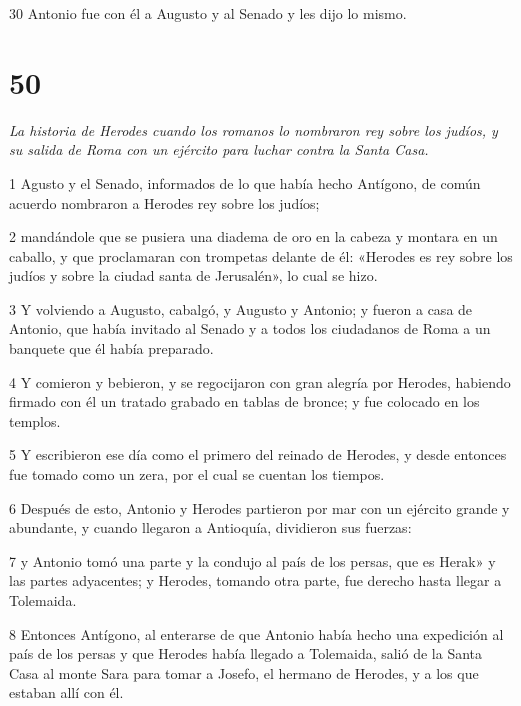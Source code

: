 \par 30 Antonio fue con él a Augusto y al Senado y les dijo lo mismo.

\chapter{50}

\par \textit{La historia de Herodes cuando los romanos lo nombraron rey sobre los judíos, y su salida de Roma con un ejército para luchar contra la Santa Casa.}

\par 1 Agusto y el Senado, informados de lo que había hecho Antígono, de común acuerdo nombraron a Herodes rey sobre los judíos;

\par 2 mandándole que se pusiera una diadema de oro en la cabeza y montara en un caballo, y que proclamaran con trompetas delante de él: «Herodes es rey sobre los judíos y sobre la ciudad santa de Jerusalén», lo cual se hizo.

\par 3 Y volviendo a Augusto, cabalgó, y Augusto y Antonio; y fueron a casa de Antonio, que había invitado al Senado y a todos los ciudadanos de Roma a un banquete que él había preparado.

\par 4 Y comieron y bebieron, y se regocijaron con gran alegría por Herodes, habiendo firmado con él un tratado grabado en tablas de bronce; y fue colocado en los templos.

\par 5 Y escribieron ese día como el primero del reinado de Herodes, y desde entonces fue tomado como un zera, por el cual se cuentan los tiempos.

\par 6 Después de esto, Antonio y Herodes partieron por mar con un ejército grande y abundante, y cuando llegaron a Antioquía, dividieron sus fuerzas:

\par 7 y Antonio tomó una parte y la condujo al país de los persas, que es Herak» y las partes adyacentes; y Herodes, tomando otra parte, fue derecho hasta llegar a Tolemaida.

\par 8 Entonces Antígono, al enterarse de que Antonio había hecho una expedición al país de los persas y que Herodes había llegado a Tolemaida, salió de la Santa Casa al monte Sara para tomar a Josefo, el hermano de Herodes, y a los que estaban allí con él.

